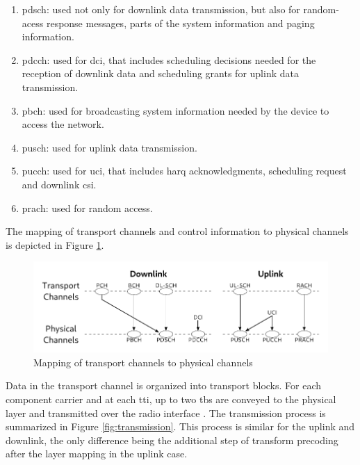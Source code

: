 \begin{enumerate}
    \item \Gls{pdsch}: used not only for downlink data transmission, but also for random-acess response messages, parts of the system information and paging information.
    \item \Gls{pdcch}: used for \gls{dci}, that includes scheduling decisions needed for the reception of downlink data and scheduling grants for uplink data transmission.
    \item \Gls{pbch}: used for broadcasting system information needed by the device to access the network.
    \item \Gls{pusch}: used for uplink data transmission.
    \item \Gls{pucch}: used for \gls{uci}, that includes \gls{harq} acknowledgments, scheduling request and downlink \gls{csi}.
    \item \Gls{prach}: used for random access.
\end{enumerate}

The mapping of transport channels and control information to physical channels is depicted in Figure \ref{fig:channel-mapping}.

\begin{figure}[htbp]
    \includegraphics[width=0.95\columnwidth]{figures/chp_theory/complete.pdf}
    \caption{Mapping of transport channels to physical channels}
    \label{fig:channel-mapping}
\end{figure}


Data in the transport channel is organized into transport blocks. For each component carrier and at each \gls{tti}, up to two \glspl{tb} are conveyed to the physical layer and transmitted over the radio interface  \cite{ErikDahlman5G}.
%
The transmission process is summarized in Figure \ref{fig:transmission}.
%
This process is similar for the uplink and downlink, the only difference being the additional step of transform precoding after the layer mapping in the uplink case.

